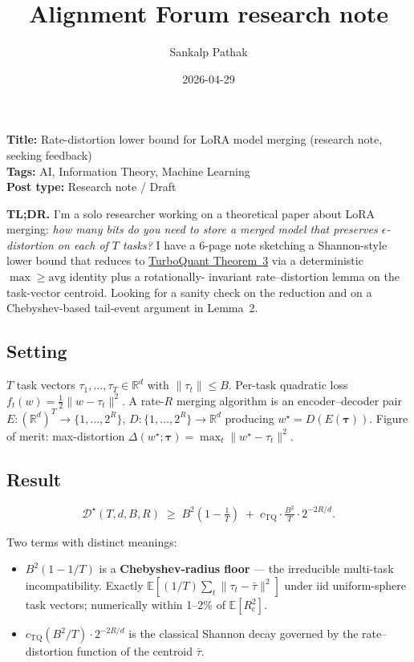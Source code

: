 \documentclass[11pt]{article}
\title{Alignment Forum research note}
\author{Sankalp Pathak}
\date{2026-04-29}
\newcommand{\R}{\mathbb{R}}
\newcommand{\E}{\mathbb{E}}
\newcommand{\cheb}{R_{\mathrm{c}}}
\begin{document}
\maketitle

\begin{framed}\small
\noindent\textbf{Title:} Rate-distortion lower bound for LoRA model merging (research note, seeking feedback) \\
\textbf{Tags:} AI, Information Theory, Machine Learning \\
\textbf{Post type:} Research note / Draft
\end{framed}

\medskip

\noindent\textbf{TL;DR.} I'm a solo researcher working on a theoretical
paper about LoRA merging: \emph{how many bits do you need to store a
merged model that preserves $\epsilon$-distortion on each of $T$
tasks?} I have a 6-page note sketching a Shannon-style lower bound
that reduces to
\href{https://arxiv.org/abs/2504.19874}{TurboQuant Theorem~3} via a
deterministic $\max\geq\mathrm{avg}$ identity plus a rotationally-
invariant rate--distortion lemma on the task-vector centroid. Looking
for a sanity check on the reduction and on a Chebyshev-based
tail-event argument in Lemma~2.

\subsection*{Setting}

$T$ task vectors $\tau_1, \dots, \tau_T \in \R^d$ with $\|\tau_t\|
\leq B$. Per-task quadratic loss $f_t(w) = \tfrac12 \|w - \tau_t\|^2$.
A rate-$R$ merging algorithm is an encoder--decoder pair
$E: (\R^d)^T \to \{1, \dots, 2^R\}$, $D: \{1, \dots, 2^R\} \to \R^d$
producing $w^\star = D(E(\boldsymbol\tau))$. Figure of merit:
max-distortion $\Delta(w^\star; \boldsymbol\tau) = \max_t \|w^\star
- \tau_t\|^2$.

\subsection*{Result}

\[
  \mathcal{D}^\star(T, d, B, R)
  \;\geq\;
  B^2\!\left(1 - \tfrac{1}{T}\right)
  \;+\; c_{\mathrm{TQ}} \cdot \tfrac{B^2}{T} \cdot 2^{-2R/d}.
\]

Two terms with distinct meanings:
\begin{itemize}[leftmargin=1.4em,itemsep=0.15em]
  \item $B^2(1 - 1/T)$ is a \textbf{Chebyshev-radius floor} --- the
  irreducible multi-task incompatibility. Exactly $\E[(1/T)\sum_t
  \|\tau_t - \bar\tau\|^2]$ under iid uniform-sphere task vectors;
  numerically within 1--2\% of $\E[\cheb^2]$.
  \item $c_{\mathrm{TQ}} (B^2/T) \cdot 2^{-2R/d}$ is the classical
  Shannon decay governed by the rate--distortion function of the
  centroid $\bar\tau$.
\end{itemize}
\end{document}
